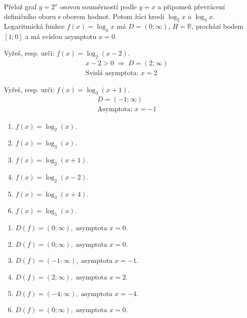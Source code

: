 \documentclass[11pt,a4paper]{article}
\begin{document}
Přelož graf $y=2^x$ osovou souměrností podle $y=x$ a připomeň převrácení definičního oboru s oborem hodnot. Potom žáci kreslí $\log_2x$ a $\log_3x$.
Logaritmická funkce $f(x)=\log_a x$ má $D=(0;\infty)$, $H=\mathbb R$, prochází bodem $[1;0]$ a má svislou asymptotu $x=0$.
\begin{prikladReseniBox}[title={Příklad 1}]
Vyřeš, resp. urči: $f(x)=\log_2(x-2)$.
\tcblower
\[\begin{aligned}x-2>0\;\Longrightarrow\;D=(2;\infty) \\ \text{Svislá asymptota: }x=2\end{aligned}\]
\end{prikladReseniBox}
\begin{prikladReseniBox}[title={Příklad 2}]
Vyřeš, resp. urči: $f(x)=\log_3(x+1)$.
\tcblower
\[\begin{aligned}D=(-1;\infty) \\ \text{Asymptota: }x=-1\end{aligned}\]
\end{prikladReseniBox}
\begin{zadaniReseniBox}[title={Samostatná práce 1}]
\begin{enumerate}[label=\alph*)]
\item $f(x)=\log_{2}(x)$.
\item $f(x)=\log_{3}(x)$.
\item $f(x)=\log_{2}(x+1)$.
\item $f(x)=\log_{2}(x-2)$.
\item $f(x)=\log_{3}(x+4)$.
\item $f(x)=\log_{5}(x)$.
\end{enumerate}
\tcblower
\begin{enumerate}[label=\alph*)]
\item $D(f)=(0;\infty),\;\text{asymptota }x=0$.
\item $D(f)=(0;\infty),\;\text{asymptota }x=0$.
\item $D(f)=(-1;\infty),\;\text{asymptota }x=-1$.
\item $D(f)=(2;\infty),\;\text{asymptota }x=2$.
\item $D(f)=(-4;\infty),\;\text{asymptota }x=-4$.
\item $D(f)=(0;\infty),\;\text{asymptota }x=0$.
\end{enumerate}
\end{zadaniReseniBox}
\end{document}
